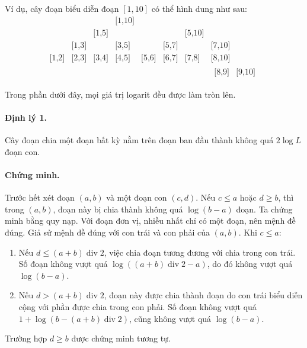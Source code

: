 \documentclass[11pt]{article}
\begin{document}
Ví dụ, cây đoạn biểu diễn đoạn $[1,10]$ có thể hình dung như sau:
\[
\begin{array}{cccccccc}
&&&\text{[1,10]}&&&&\\
&&\text{[1,5]}&&&&\text{[5,10]}&\\
&\text{[1,3]}&&\text{[3,5]}&&\text{[5,7]}&&\text{[7,10]}\\
\text{[1,2]}&\text{[2,3]}&\text{[3,4]}&\text{[4,5]}&
\text{[5,6]}&\text{[6,7]}&\text{[7,8]}&\text{[8,10]}\\
&&&&&&&\begin{array}{cc}\text{[8,9]}&\text{[9,10]}\end{array}
\end{array}
\]

Trong phần dưới đây, mọi giá trị logarit đều được làm tròn lên.

\paragraph{Định lý 1.}
Cây đoạn chia một đoạn bất kỳ nằm trên đoạn ban đầu thành không quá
$2\log L$ đoạn con.

\paragraph{Chứng minh.}
Trước hết xét đoạn $(a,b)$ và một đoạn con $(c,d)$. Nếu $c\le a$ hoặc
$d\ge b$, thì trong $(a,b)$, đoạn này bị chia thành không quá $\log(b-a)$
đoạn. Ta chứng minh bằng quy nạp. Với đoạn đơn vị, nhiều nhất chỉ có một đoạn,
nên mệnh đề đúng. Giả sử mệnh đề đúng với con trái và con phải của $(a,b)$.
Khi $c\le a$:
\begin{enumerate}
  \item Nếu $d\le (a+b)\operatorname{div}2$, việc chia đoạn tương đương với
  chia trong con trái. Số đoạn không vượt quá
  $\log((a+b)\operatorname{div}2-a)$, do đó không vượt quá $\log(b-a)$.
  \item Nếu $d>(a+b)\operatorname{div}2$, đoạn này được chia thành đoạn do
  con trái biểu diễn cộng với phần được chia trong con phải. Số đoạn không
  vượt quá $1+\log(b-(a+b)\operatorname{div}2)$, cũng không vượt quá
  $\log(b-a)$.
\end{enumerate}
Trường hợp $d\ge b$ được chứng minh tương tự.
\end{document}
